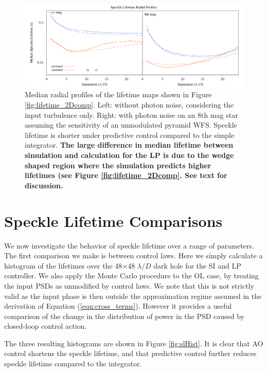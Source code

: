 \documentclass[10pt,preprint]{aastex631}
\begin{document}
\begin{figure}
\hspace{-0.3in}
\includegraphics[width=6.5in]{lifetimesRP.pdf}
\caption{Median radial profiles of the lifetime maps shown in Figure \ref{fig:lifetime_2Dcomp}.  Left: without photon noise, considering the input turbulence only.  Right: with photon noise on an 8th mag star assuming the sensitivity of an unmodulated pyramid WFS. Speckle lifetime is shorter under predictive control compared to the simple integrator. \textbf{The large difference in median lifetime between simulation and calculation for the LP is due to the wedge shaped region where the simulation predicts higher lifetimes (see Figure \ref{fig:lifetime_2Dcomp}.  See text for discussion.}  \label{fig:lifetime_radprof}}
\end{figure}

\clearpage

\section{Speckle Lifetime Comparisons}
\label{sec:trends}

We now investigate the behavior of speckle lifetime over a range of parameters.  The first comparison we make is between control laws.  Here we simply calculate a histogram of the lifetimes over the 48$\times$48 $\lambda/D$ dark hole for the SI and LP controller.  We also apply the Monte Carlo procedure to the OL case, by treating the input PSDs as unmodified by control laws.  We note that this is not strictly valid as the input phase is then outside the approximation regime assumed in the derivation of Equation (\ref{eqn:cross_terms}).  However it provides a useful comparison of the change in the distribution of power in the PSD caused by closed-loop control action. 

The three resulting histograms are shown in Figure \ref{fig:slHist}.  It is clear that AO control shortens the speckle lifetime, and that predictive control further reduces speckle lifetime compared to the integrator.
\end{document}
